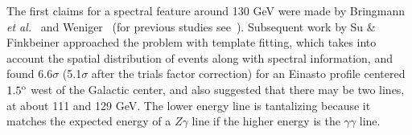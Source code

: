\documentclass[aps,prd,superscriptaddress,showpacs,nofootinbib,fixlfloat, 12pt]{revtex4-1}
\newcommand{\Fermi}{{\slshape Fermi}}
\newcommand{\degree}{^{\rm o}}
\begin{document}
The first claims for a spectral feature around 130 GeV were made by Bringmann
\textit{et al.}~\citep{Bringmann:2012} and Weniger~\citep{Weniger:2012} (for
previous studies see~\cite{Pullen:2006sy, Abdo:2010nc, Vertongen:2011mu,
Ackermann:2012qk}). Subsequent work by Su \& Finkbeiner approached the problem
with template fitting, which takes into account the spatial distribution of
events along with spectral information, and found 6.6$\sigma$ (5.1$\sigma$
after the trials factor correction) for an Einasto profile centered
$1.5\degree$ west of the Galactic center, and also suggested that there may
be two lines, at about 111 and 129 GeV. The lower energy line is
tantalizing because it matches the expected energy of a $Z\gamma$ line if
the higher energy is the $\gamma\gamma$ line.  

 

 
\end{document}
